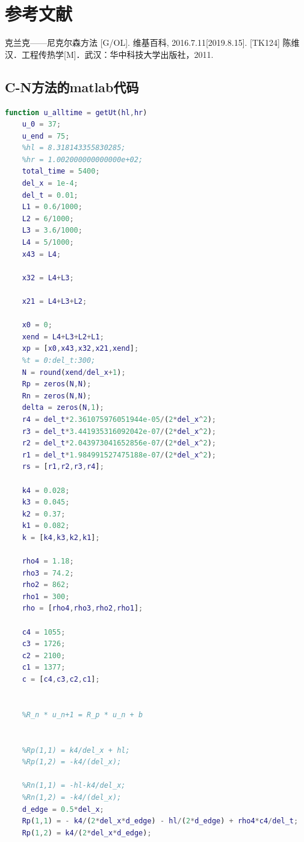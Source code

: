 \documentclass{cumcmthesis}
\begin{document}
\section{参考文献}


\begin{thebibliography}{9}%
  克兰克——尼克尔森方法 [G/OL]. 维基百科, 2016.7.11[2019.8.15].
  [TK124] 陈维汉．工程传热学[M]．武汉：华中科技大学出版社，2011.
\end{thebibliography}

\newpage
\begin{appendices}
\section{C-N方法的matlab代码}
\begin{lstlisting}[language=matlab]
    function u_alltime = getUt(hl,hr)
    u_0 = 37;
    u_end = 75;
    %hl = 8.318143355830285;
    %hr = 1.002000000000000e+02;
    total_time = 5400;
    del_x = 1e-4;
    del_t = 0.01;
    L1 = 0.6/1000;
    L2 = 6/1000;
    L3 = 3.6/1000;
    L4 = 5/1000;
    x43 = L4;
    
    x32 = L4+L3;
    
    x21 = L4+L3+L2;
    
    x0 = 0;
    xend = L4+L3+L2+L1;
    xp = [x0,x43,x32,x21,xend];
    %t = 0:del_t:300;
    N = round(xend/del_x+1);
    Rp = zeros(N,N);
    Rn = zeros(N,N);
    delta = zeros(N,1);
    r4 = del_t*2.361075976051944e-05/(2*del_x^2);
    r3 = del_t*3.441935316092042e-07/(2*del_x^2);
    r2 = del_t*2.043973041652856e-07/(2*del_x^2);
    r1 = del_t*1.984991527475188e-07/(2*del_x^2);
    rs = [r1,r2,r3,r4];
    
    k4 = 0.028;
    k3 = 0.045;
    k2 = 0.37;
    k1 = 0.082;
    k = [k4,k3,k2,k1];
    
    rho4 = 1.18;
    rho3 = 74.2;
    rho2 = 862;
    rho1 = 300;
    rho = [rho4,rho3,rho2,rho1];
    
    c4 = 1055;
    c3 = 1726;
    c2 = 2100;
    c1 = 1377;
    c = [c4,c3,c2,c1];
    
    
    %R_n * u_n+1 = R_p * u_n + b
    
    
    %Rp(1,1) = k4/del_x + hl;
    %Rp(1,2) = -k4/(del_x);
    
    %Rn(1,1) = -hl-k4/del_x;
    %Rn(1,2) = -k4/(del_x);
    d_edge = 0.5*del_x;
    Rp(1,1) = - k4/(2*del_x*d_edge) - hl/(2*d_edge) + rho4*c4/del_t;
    Rp(1,2) = k4/(2*del_x*d_edge);
    

\end{lstlisting}
\end{appendices}
\end{document}
